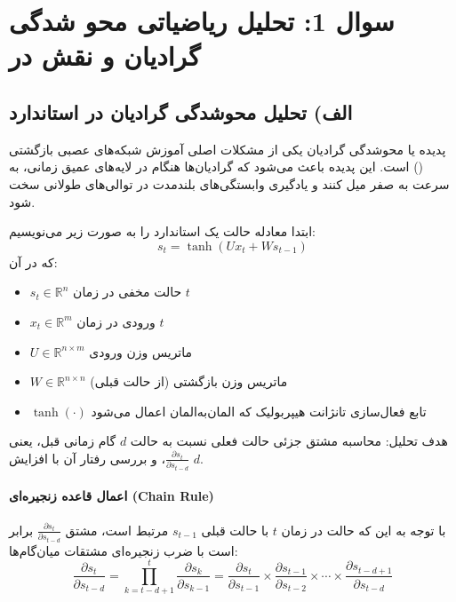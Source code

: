 \documentclass{article}
\begin{document}


\tableofcontents \clearpage
\listoffigures \clearpage
\newpage

\section {سوال 1: تحلیل ریاضیاتی محو شدگی گرادیان و نقش  در }
\subsection{الف) تحلیل محوشدگی گرادیان در  استاندارد}

پدیده  یا محوشدگی گرادیان یکی از مشکلات اصلی آموزش شبکه‌های عصبی بازگشتی () است. این پدیده باعث می‌شود که گرادیان‌ها هنگام  در لایه‌های عمیق زمانی، به سرعت به صفر میل کنند و یادگیری وابستگی‌های بلندمدت در توالی‌های طولانی سخت شود.

\medskip

\noindent ابتدا معادله حالت یک  استاندارد را به صورت زیر می‌نویسیم:
\begin{equation}
	s_t = \tanh\left(U x_t + W s_{t-1}\right)
\end{equation}
که در آن:
\begin{itemize}
	\item \(s_t \in \mathbb{R}^n\) حالت مخفی در زمان \(t\)
	\item \(x_t \in \mathbb{R}^m\) ورودی در زمان \(t\)
	\item \(U \in \mathbb{R}^{n \times m}\) ماتریس وزن ورودی
	\item \(W \in \mathbb{R}^{n \times n}\) ماتریس وزن بازگشتی (از حالت قبلی)
	\item \(\tanh(\cdot)\) تابع فعال‌سازی تانژانت هیپربولیک که المان‌به‌المان اعمال می‌شود
\end{itemize}

هدف تحلیل: محاسبه مشتق جزئی حالت فعلی نسبت به حالت \(d\) گام زمانی قبل، یعنی \(\frac{\partial s_t}{\partial s_{t-d}}\)، و بررسی رفتار آن با افزایش \(d\).

\bigskip

\paragraph{اعمال قاعده زنجیره‌ای (Chain Rule)}

با توجه به این که حالت در زمان \(t\) با حالت قبلی \(s_{t-1}\) مرتبط است، مشتق \(\frac{\partial s_t}{\partial s_{t-d}}\) برابر است با ضرب زنجیره‌ای مشتقات میان‌گام‌ها:
\begin{equation}
	\frac{\partial s_t}{\partial s_{t-d}} = \prod_{k=t-d+1}^{t} \frac{\partial s_k}{\partial s_{k-1}} = \frac{\partial s_t}{\partial s_{t-1}} \times \frac{\partial s_{t-1}}{\partial s_{t-2}} \times \cdots \times \frac{\partial s_{t-d+1}}{\partial s_{t-d}}
	\label{eq:chain_rule}
\end{equation}
\end{document}
